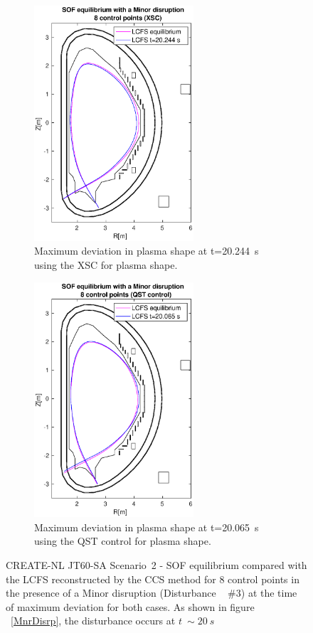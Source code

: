 \begin{figure}[h]
	\centering
	\begin{subfigure}[b]{0.32\textwidth}
		\includegraphics[height=8.75cm] {Chp3/Results_iso/8_gaps_mnr_disrp_20.244s.eps}  
		\caption{ Maximum deviation in plasma shape at t=20.244~s using the XSC for plasma shape.
			\label{XSC_20s} }
	\end{subfigure}
	\hspace{2 cm}
	\begin{subfigure}[b]{0.32\textwidth}
		\includegraphics[height=8.75cm] {Chp3/Results_iso/8_gaps_mnr_disrp_20065sFBC.eps}  
		\caption{Maximum deviation in plasma shape at t=20.065~s using the QST control for plasma shape.
			\label{FBC_20s} }
	\end{subfigure}
	
	
	\caption{  CREATE-NL JT60-SA Scenario~2 - SOF equilibrium compared with the LCFS reconstructed by the CCS method for 8 control points in the presence of a Minor disruption (Disturbance ~ $\#3$) at the time of maximum deviation for both cases. As shown in figure ~\ref{MnrDisrp}, the disturbance occurs at $t~\sim 20 ~ s$  \label{20secs}}
\end{figure}



